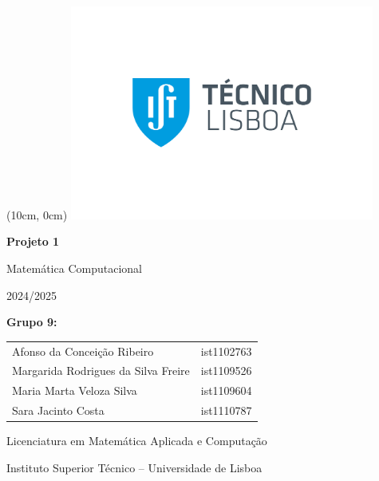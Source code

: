 \documentclass[12pt,a4paper]{article}
\newcommand{\reporttitle}{Projeto 1}
\newcommand{\degree}{Licenciatura em Matemática Aplicada e Computação}
\newcommand{\istul}{Instituto Superior Técnico -- Universidade de Lisboa}
\newcommand{\reportcourse}{Matemática Computacional}
\newcommand{\reportyear}{2024/2025}
\begin{document}
    \begin{titlepage}

        \begin{textblock*}{0cm}(10cm, 0cm)
            \includegraphics[width=10cm]{Logo IST.jpg}
        \end{textblock*}

        \centering
        \vspace*{5cm}
        {\Huge \textbf{\reporttitle} \par}

        \vspace{0.5cm}
        {\LARGE \reportcourse \par}

        \vspace{0.5cm}
        {\large \reportyear \par}

        \vspace{2cm}
        {\large
        \textbf{Grupo 9:} \\
        \begin{center}
            \begin{tabular}{l l}
                Afonso da Conceição Ribeiro & ist1102763 \\
                Margarida Rodrigues da Silva Freire & ist1109526 \\
                Maria Marta Veloza Silva & ist1109604 \\
                Sara Jacinto Costa & ist1110787 \\
            \end{tabular}
        \end{center}
        }

        \vspace{1cm}
        {\large \degree \par}
        {\large \istul \par}

        \newpage
        \renewcommand{\contentsname}{Índice}
        \tableofcontents

        \thispagestyle{empty}
        \clearpage

    \end{titlepage}
\end{document}
